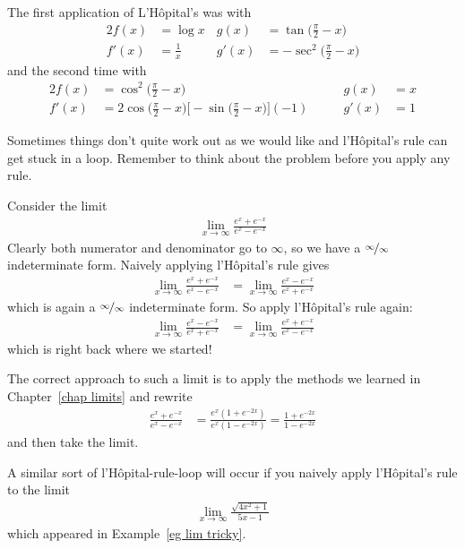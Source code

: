 \begin{enumerate}[(a)]
\begin{eg}
The first application of L'H\^opital's was with
\begin{alignat*}{2}
  f(x) &= \log x &
  g(x) &=\tan\Big(\frac{\pi}{2}-x\Big)   \\
  f'(x)&=\frac{1}{x}\qquad&
  g'(x)&=-\sec^2\Big(\frac{\pi}{2}-x\Big)
\end{alignat*}
and the second time with
\begin{alignat*}{2}
  f(x) &= \cos^2\Big(\frac{\pi}{2}-x\Big) &
  g(x) &=x   \\[0.1in]
  f'(x)&=2\cos\Big(\frac{\pi}{2}-x\Big)
          \Big[-\sin\Big(\frac{\pi}{2}-x\Big)\Big](-1)\qquad&
  g'(x)&=1
\end{alignat*}
\end{eg}

Sometimes things don't quite work out as we would like and l'H\^opital's rule can get
stuck in a loop. Remember to think about the problem before you apply any rule.
\begin{eg}
 Consider the limit
\begin{align*}
  \lim_{x\to\infty} \frac{ e^x + e^{-x} }{e^x - e^{-x}}
\end{align*}
Clearly both numerator and denominator go to $\infty$, so we have a
$\nicefrac\infty\infty$ indeterminate form. Naively applying l'H\^opital's rule gives
\begin{align*}
  \lim_{x\to\infty} \frac{ e^x + e^{-x} }{e^x - e^{-x}}
  &= \lim_{x\to\infty} \frac{ e^x - e^{-x} }{e^x + e^{-x}}
\end{align*}
which is again a $\nicefrac\infty\infty$ indeterminate form. So apply l'H\^opital's rule
again:
\begin{align*}
\lim_{x\to\infty} \frac{ e^x - e^{-x} }{e^x + e^{-x}}
  &= \lim_{x\to\infty} \frac{ e^x + e^{-x} }{e^x - e^{-x}}
\end{align*}
which is right back where we started!

The correct approach to such a limit is to apply the methods we learned in
Chapter~\ref{chap limits} and rewrite
\begin{align*}
  \frac{e^x+e^{-x}}{e^x-e^{-x}} &= \frac{e^x(1+e^{-2x})}{e^x(1-e^{-2x})}
  = \frac{1+e^{-2x}}{1-e^{-2x}}
\end{align*}
and then take the limit.

A similar sort of l'H\^opital-rule-loop will occur if you naively apply
l'H\^opital's rule to the limit
\begin{align*}
  \lim_{x\to\infty} \frac{\sqrt{4x^2+1}}{5x-1}
\end{align*}
which appeared in Example~\ref{eg lim tricky}.
\end{eg}


\end{enumerate}
